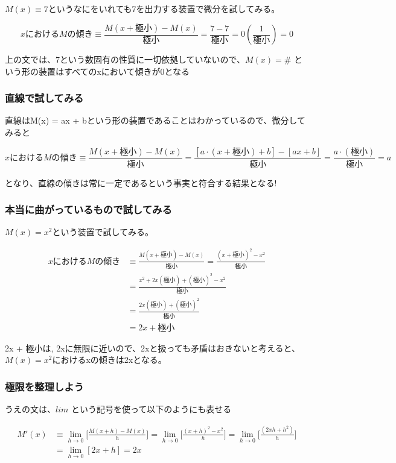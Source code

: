 \documentclass[dvipdfmx]{jsarticle}
\begin{document}
$M(x) \equiv 7$というなにをいれても7を出力する装置で微分を試してみる。

\[ xにおけるMの傾き \equiv \frac{M(x + 極小) - M(x)}{極小} = \frac{7-7}{極小} = 0(\frac{1}{極小}) = 0 \]

上の文では、7という数固有の性質に一切依拠していないので、$M(x) = \#$ という形の装置はすべてのxにおいて傾きが0となる


\subsubsection{直線で試してみる}

直線はM(x) = ax + bという形の装置であることはわかっているので、微分してみると

\[ xにおけるMの傾き \equiv \frac{M(x + 極小) - M(x)}{極小} = \frac{[a \cdot (x + 極小) + b] - [ax + b]}{極小} = \frac{a \cdot (極小)}{極小} = a \]

となり、直線の傾きは常に一定であるという事実と符合する結果となる!

\subsubsection{本当に曲がっているもので試してみる}

$M(x) = x^2$という装置で試してみる。

\begin{align*}
  xにおけるMの傾き &\equiv \frac{M(x + 極小) - M(x)}{極小} = \frac{(x + 極小)^2 - x^2}{極小} \\
  &= \frac{x^2 + 2x(極小) + (極小)^2 - x^2}{極小} \\
  &= \frac{2x(極小) + (極小)^2}{極小} \\
  &= 2x + 極小
\end{align*}

2x + 極小は, 2xに無限に近いので、2xと扱っても矛盾はおきないと考えると、$M(x) = x^2$におけるxの傾きは2xとなる。

\subsubsection{極限を整理しよう}

うえの文は、$lim$ という記号を使って以下のようにも表せる

\begin{align*}
  M'(x) &\equiv \lim_{h \to 0} \biggl[ \frac{M(x+h)-M(x)}{h}\biggr] = \lim_{h \to 0} \biggl[ \frac{(x+h)^2 -x^2}{h}\biggr] = \lim_{h \to 0} \biggl[ \frac{(2xh + h^2)}{h}\biggr] \\
  &= \lim_{h \to 0}[2x +h] = 2x
\end{align*}
\end{document}

